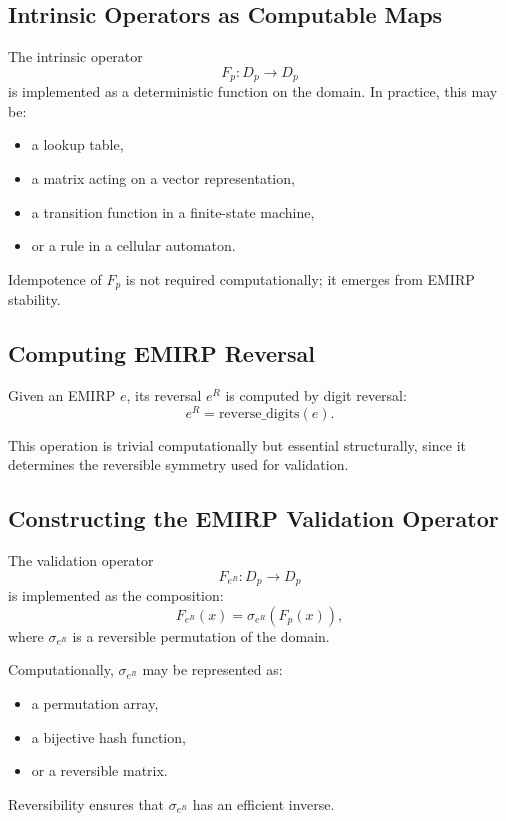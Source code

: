 \documentclass[11pt]{article}
\theoremstyle{definition}
\theoremstyle{plain}
\theoremstyle{remark}
\begin{document}
\subsection{Intrinsic Operators as Computable Maps}

The intrinsic operator
\[
F_p : D_p \to D_p
\]
is implemented as a deterministic function on the domain. In practice,
this may be:

\begin{itemize}
    \item a lookup table,
    \item a matrix acting on a vector representation,
    \item a transition function in a finite-state machine,
    \item or a rule in a cellular automaton.
\end{itemize}

Idempotence of $F_p$ is not required computationally; it emerges from
EMIRP stability.

\subsection{Computing EMIRP Reversal}

Given an EMIRP $e$, its reversal $e^R$ is computed by digit reversal:
\[
e^R = \text{reverse\_digits}(e).
\]

This operation is trivial computationally but essential structurally,
since it determines the reversible symmetry used for validation.

\subsection{Constructing the EMIRP Validation Operator}

The validation operator
\[
F_{e^R} : D_p \to D_p
\]
is implemented as the composition:
\[
F_{e^R}(x) = \sigma_{e^R}(F_p(x)),
\]
where $\sigma_{e^R}$ is a reversible permutation of the domain.

Computationally, $\sigma_{e^R}$ may be represented as:

\begin{itemize}
    \item a permutation array,
    \item a bijective hash function,
    \item or a reversible matrix.
\end{itemize}

Reversibility ensures that $\sigma_{e^R}$ has an efficient inverse.
\end{document}
